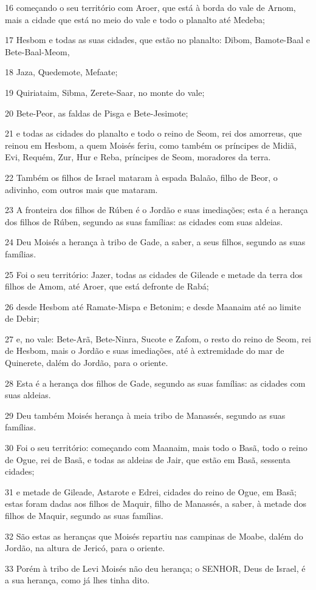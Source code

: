 \par 16 começando o seu território com Aroer, que está à borda do vale de Arnom, mais a cidade que está no meio do vale e todo o planalto até Medeba;
\par 17 Hesbom e todas as suas cidades, que estão no planalto: Dibom, Bamote-Baal e Bete-Baal-Meom,
\par 18 Jaza, Quedemote, Mefaate;
\par 19 Quiriataim, Sibma, Zerete-Saar, no monte do vale;
\par 20 Bete-Peor, as faldas de Pisga e Bete-Jesimote;
\par 21 e todas as cidades do planalto e todo o reino de Seom, rei dos amorreus, que reinou em Hesbom, a quem Moisés feriu, como também os príncipes de Midiã, Evi, Requém, Zur, Hur e Reba, príncipes de Seom, moradores da terra.
\par 22 Também os filhos de Israel mataram à espada Balaão, filho de Beor, o adivinho, com outros mais que mataram.
\par 23 A fronteira dos filhos de Rúben é o Jordão e suas imediações; esta é a herança dos filhos de Rúben, segundo as suas famílias: as cidades com suas aldeias.
\par 24 Deu Moisés a herança à tribo de Gade, a saber, a seus filhos, segundo as suas famílias.
\par 25 Foi o seu território: Jazer, todas as cidades de Gileade e metade da terra dos filhos de Amom, até Aroer, que está defronte de Rabá;
\par 26 desde Hesbom até Ramate-Mispa e Betonim; e desde Maanaim até ao limite de Debir;
\par 27 e, no vale: Bete-Arã, Bete-Ninra, Sucote e Zafom, o resto do reino de Seom, rei de Hesbom, mais o Jordão e suas imediações, até à extremidade do mar de Quinerete, dalém do Jordão, para o oriente.
\par 28 Esta é a herança dos filhos de Gade, segundo as suas famílias: as cidades com suas aldeias.
\par 29 Deu também Moisés herança à meia tribo de Manassés, segundo as suas famílias.
\par 30 Foi o seu território: começando com Maanaim, mais todo o Basã, todo o reino de Ogue, rei de Basã, e todas as aldeias de Jair, que estão em Basã, sessenta cidades;
\par 31 e metade de Gileade, Astarote e Edrei, cidades do reino de Ogue, em Basã; estas foram dadas aos filhos de Maquir, filho de Manassés, a saber, à metade dos filhos de Maquir, segundo as suas famílias.
\par 32 São estas as heranças que Moisés repartiu nas campinas de Moabe, dalém do Jordão, na altura de Jericó, para o oriente.
\par 33 Porém à tribo de Levi Moisés não deu herança; o SENHOR, Deus de Israel, é a sua herança, como já lhes tinha dito.

